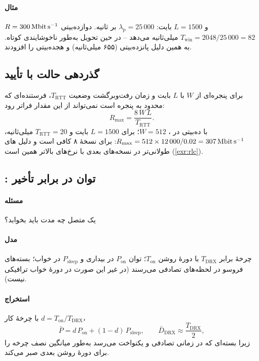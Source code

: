 \documentclass[11pt,a4paper]{article}
\begin{document}
\paragraph{مثال} $R = \qty{300}{\mega\bit\per\second}$ و $L = 1500$ بایت: $\lambda_\mathrm{p} = 25\,000$
 بر ثانیه.  دوازده‌بیتی $T_{\mathrm{win}} = 2048/25\,000 = 82$ میلی‌ثانیه می‌دهد -- در حین
تحویل به‌طور ناخوشایندی کوتاه. به همین دلیل   پانزده‌بیتی (۶۵۵ میلی‌ثانیه) و  
هجده‌بیتی  را افزودند.

\subsection{گذردهی حالت با تأیید }\label{sec:rlcwin}
برای پنجره‌ای از $W$  با $L$ بایت و زمان رفت‌وبرگشت وضعیت $T_{\mathrm{RTT}}$، فرستنده‌ای که محدود
به پنجره است نمی‌تواند از این مقدار فراتر رود:
\begin{equation}\label{eq:rlc}
  R_{\max} = \frac{8\,W\,L}{T_{\mathrm{RTT}}} .
\end{equation}
با  ده‌بیتی  در ، $W = 512$؛ برای $L = 1500$ بایت و $T_{\mathrm{RTT}} = 20$ میلی‌ثانیه،
$R_{\max} = 512\times12\,000/0.02 = \qty{307}{\mega\bit\per\second}$: برای نسخهٔ ۸ کافی است و دلیل های
طولانی‌تر در نسخه‌های بعدی با نرخ‌های بالاتر همین است (\cref{exr:rlc}).

\subsection{: توان در برابر تأخیر}\label{sec:drx}
\paragraph{مسئله} یک  متصل چه مدت باید بخوابد؟
\paragraph{مدل} چرخهٔ  برابر $T_{\mathrm{DRX}}$ با دورهٔ روشن $T_{\mathrm{on}}$؛ توان $P_{\mathrm{on}}$ در بیداری
و $P_{\mathrm{sleep}}$ در خواب؛ بسته‌های فروسو در لحظه‌های تصادفی می‌رسند (در غیر این صورت در دورهٔ خواب
ترافیکی نیست).
\paragraph{استخراج} با چرخهٔ کار $d = T_{\mathrm{on}}/T_{\mathrm{DRX}}$،
\begin{equation}\label{eq:drx}
  \bar P = d\,P_{\mathrm{on}} + (1-d)\,P_{\mathrm{sleep}}, \qquad
  \bar D_{\mathrm{DRX}} \approx \frac{T_{\mathrm{DRX}}}{2},
\end{equation}
زیرا بسته‌ای که در زمانی تصادفی و یکنواخت می‌رسد به‌طور میانگین نصف چرخه را برای دورهٔ روشن بعدی صبر
می‌کند.
\end{document}
